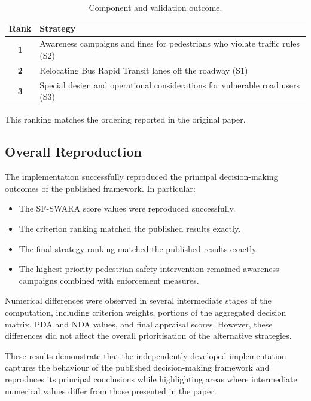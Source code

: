\documentclass[11pt]{article}
\begin{document}
\begin{table}[h]
    \centering
    \begin{tabular}{cl}
        \toprule
        \textbf{Rank} & \textbf{Strategy} \\
        \midrule
        \textbf{1} & Awareness campaigns and fines for pedestrians who violate traffic rules (S2) \\
        \textbf{2} & Relocating Bus Rapid Transit lanes off the roadway (S1) \\
        \textbf{3} & Special design and operational considerations for vulnerable road users (S3) \\
        \bottomrule
    \end{tabular}
    \caption{Component and validation outcome.}
    \label{tab:ranking}
\end{table}

This ranking matches the ordering reported in the original paper.

\subsection{Overall Reproduction}
The implementation successfully reproduced the principal decision-making outcomes of the published framework. In particular:

\begin{itemize}
    \item The SF-SWARA score values were reproduced successfully.
    \item The criterion ranking matched the published results exactly.
    \item The final strategy ranking matched the published results exactly.
    \item The highest-priority pedestrian safety intervention remained awareness campaigns combined with enforcement measures.
\end{itemize}

Numerical differences were observed in several intermediate stages of the computation, including criterion weights, portions of the aggregated decision matrix, PDA and NDA values, and final appraisal scores. However, these differences did not affect the overall prioritisation of the alternative strategies.

These results demonstrate that the independently developed implementation captures the behaviour of the published decision-making framework and reproduces its principal conclusions while highlighting areas where intermediate numerical values differ from those presented in the paper.
\end{document}

